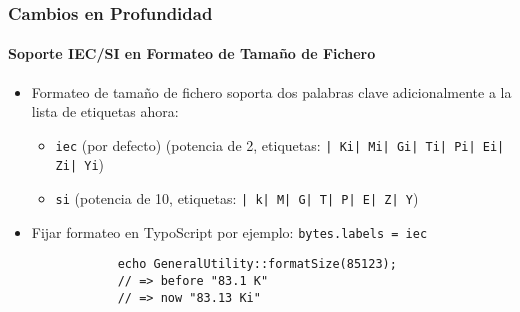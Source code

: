 \begin{frame}[fragile]
	\frametitle{Cambios en Profundidad}
	\framesubtitle{Soporte IEC/SI en Formateo de Tamaño de Fichero}


	\begin{itemize}

		\item Formateo de tamaño de fichero soporta dos palabras clave adicionalmente a la lista de etiquetas ahora:

			\begin{itemize}
				\item \small\texttt{iec} (por defecto)\newline
					\small(potencia de 2, etiquetas: \texttt{| Ki| Mi| Gi| Ti| Pi| Ei| Zi| Yi})\normalsize
				\item \small\texttt{si}\newline
					\small(potencia de 10, etiquetas: \texttt{| k| M| G| T| P| E| Z| Y})\normalsize
			\end{itemize}

		\item Fijar formateo en TypoScript por ejemplo:\newline
			\texttt{bytes.labels = iec}

		\begin{lstlisting}
			echo GeneralUtility::formatSize(85123);
			// => before "83.1 K"
			// => now "83.13 Ki"
		\end{lstlisting}

	\end{itemize}

\end{frame}


